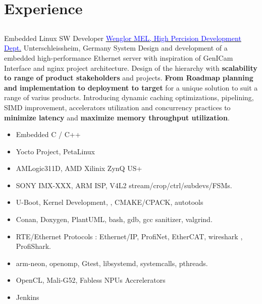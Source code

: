 \section{Experience}

\vspace{2mm}
\subsection{\Large{\textcolor{red}{}}}
        { Embedded Linux SW Developer}
        {\href{https://www.wenglor.com/en/}{\textcolor{blue}{Wenglor MEL, High Percision Development Dept.}}}
        {Unterschleissheim, Germany}
        {
        \newline
        System Design and development of a embedded high-performance Ethernet server with inspiration of GenICam Interface and nginx project architecture. 
          Design of the hierarchy with \textbf{scalability to range of product stakeholders} and projects. \textbf{From Roadmap planning and implementation to deployment to target} for a unique solution to suit a range of varius products.
          Introducing dynamic caching optimizations, pipelining, SIMD improvement, accelerators utilization and concurrency practices to \textbf{minimize latency} and \textbf{maximize memory throughput utilization}.
        }
        {
        \begin{itemize}
            \item Embedded C / C++
            \item Yocto Project, PetaLinux
            \item AMLogic311D, AMD Xilinix ZynQ US+
            \item SONY IMX-XXX,  ARM ISP, V4L2 stream/crop/ctrl/subdevs/FSMs.
            \item U-Boot, Kernel Development, , CMAKE/CPACK, autotools
            \item Conan, Doxygen, PlantUML, bash, gdb, gcc sanitizer, valgrind.
            \item RTE/Ethernet Protocols : Ethernet/IP, ProfiNet, EtherCAT, wireshark , ProfiShark.
            \item arm-neon, openomp, Gtest, libsystemd, systemcalls, pthreads.
            \item OpenCL, Mali-G52, Fabless NPUs Accrelerators
            \item Jenkins
        \end{itemize}
        }
        

